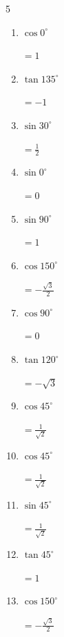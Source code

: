 \begin{multicols}{5}
\begin{enumerate}
  \item $\displaystyle \cos{0^\circ}$

        $\displaystyle =1$

\columnbreak %

  \item $\displaystyle \tan{135^\circ}$

        $\displaystyle =-1$

  \item $\displaystyle \sin{30^\circ}$

        $\displaystyle =\frac{1}{2}$

  \item $\displaystyle \sin{0^\circ}$

        $\displaystyle =0$

  \item $\displaystyle \sin{90^\circ}$

        $\displaystyle =1$

  \item $\displaystyle \cos{150^\circ}$

        $\displaystyle =-\frac{\sqrt{3}}{2}$

  \item $\displaystyle \cos{90^\circ}$

        $\displaystyle =0$

  \item $\displaystyle \tan{120^\circ}$

        $\displaystyle =-\sqrt{3}$

  \item $\displaystyle \cos{45^\circ}$

        $\displaystyle =\frac{1}{\sqrt{2}}$

  \item $\displaystyle \cos{45^\circ}$

        $\displaystyle =\frac{1}{\sqrt{2}}$

  \item $\displaystyle \sin{45^\circ}$

        $\displaystyle =\frac{1}{\sqrt{2}}$

  \item $\displaystyle \tan{45^\circ}$

        $\displaystyle =1$

  \item $\displaystyle \cos{150^\circ}$

        $\displaystyle =-\frac{\sqrt{3}}{2}$


\end{enumerate}
\end{multicols}
